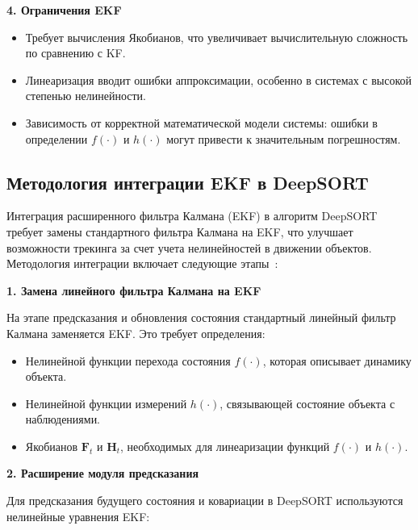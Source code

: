 \textbf{4. Ограничения EKF}

\begin{itemize}

    \item Требует вычисления Якобианов, что увеличивает вычислительную сложность по сравнению с KF.

    \item Линеаризация вводит ошибки аппроксимации, особенно в системах с высокой степенью нелинейности.

    \item Зависимость от корректной математической модели системы: ошибки в определении $f(\cdot)$ и $h(\cdot)$ могут привести к значительным погрешностям.

\end{itemize}

\subsection{Методология интеграции EKF в DeepSORT}

Интеграция расширенного фильтра Калмана (EKF) в алгоритм DeepSORT требует замены стандартного фильтра Калмана на EKF, что улучшает возможности трекинга за счет учета нелинейностей в движении объектов. Методология интеграции включает следующие этапы~\cite{Wojke2017}:

\textbf{1. Замена линейного фильтра Калмана на EKF}

На этапе предсказания и обновления состояния стандартный линейный фильтр Калмана заменяется EKF. Это требует определения:

\begin{itemize}

    \item Нелинейной функции перехода состояния $f(\cdot)$, которая описывает динамику объекта.

    \item Нелинейной функции измерений $h(\cdot)$, связывающей состояние объекта с наблюдениями.

    \item Якобианов $\mathbf{F}_t$ и $\mathbf{H}_t$, необходимых для линеаризации функций $f(\cdot)$ и $h(\cdot)$.

\end{itemize}

\textbf{2. Расширение модуля предсказания}

Для предсказания будущего состояния и ковариации в DeepSORT используются нелинейные уравнения EKF:

